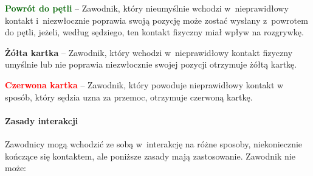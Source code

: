 \documentclass[12pt,a4paper]{article}
\newcommand\redcard[1]{\bgroup\textcolor{red}{\textbf{#1}}}
\newcommand\yellowcard[1]{\bgroup\textcolor{darkyellow}{\textbf{#1}}}
\newcommand\other[1]{\bgroup\textcolor{darkgreen}{\textbf{#1}}}
\begin{document}
\other{Powrót do pętli} -- Zawodnik, który nieumyślnie wchodzi w~nieprawidłowy kontakt
i~niezwłocznie poprawia swoją pozycję może zostać
wysłany z~powrotem do pętli, jeżeli, według sędziego, ten kontakt
fizyczny miał wpływ na rozgrywkę.

\yellowcard{Żółta kartka} -- Zawodnik, który wchodzi w~nieprawidłowy kontakt
fizyczny umyślnie lub nie poprawia niezwłocznie swojej pozycji otrzymuje
żółtą kartkę.

\redcard{Czerwona kartka} -- Zawodnik, który powoduje nieprawidłowy kontakt
w sposób, który sędzia uzna za przemoc, otrzymuje czerwoną kartkę.

\paragraph{Zasady interakcji}
Zawodnicy mogą wchodzić ze sobą w~interakcję na różne sposoby, niekoniecznie kończące się kontaktem, ale
poniższe zasady mają zastosowanie. Zawodnik nie może:
\end{document}
